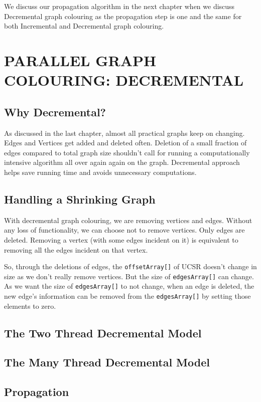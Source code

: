 \documentclass[MTech]{iitmdiss}
\begin{document}
We discuss our propagation algorithm in the next chapter when we discuss Decremental graph colouring as the propagation step is one and the same for both Incremental and Decremental graph colouring.

\chapter{PARALLEL GRAPH COLOURING: DECREMENTAL}
\section{Why Decremental?}
As discussed in the last chapter, almost all practical graphs keep on changing. Edges and Vertices get added and deleted often. Deletion of a small fraction of edges compared to total graph size shouldn't call for running a computationally intensive algorithm all over again again on the graph. Decremental approach helps save running time and avoids unnecessary computations.

\section{Handling a Shrinking Graph}
With decremental graph colouring, we are removing vertices and edges. Without any loss of functionality, we can choose not to remove vertices. Only edges are deleted. Removing a vertex (with some edges incident on it) is equivalent to removing all the edges incident on that vertex. 

So, through the deletions of edges, the \verb+offsetArray[]+ of UCSR doesn't change in size as we don't really remove vertices. But the size of \verb+edgesArray[]+ can change. As we want the size of \verb+edgesArray[]+ to not change, when an edge is deleted, the new edge's information can be removed from the \verb+edgesArray[]+ by setting those elements to zero.
\section{The Two Thread Decremental Model}

\section{The Many Thread Decremental Model}

\section{Propagation}
\end{document}
